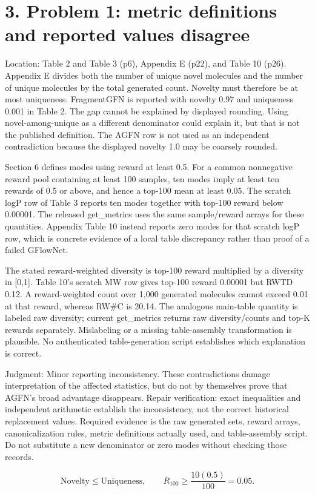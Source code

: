 \documentclass[10pt]{article}
\begin{document}
\section*{3. Problem 1: metric definitions and reported values disagree}
Location: Table 2 and Table 3 (p6), Appendix E (p22), and Table 10 (p26). Appendix E divides both the number of unique novel molecules and the number of unique molecules by the total generated count. Novelty must therefore be at most uniqueness. FragmentGFN is reported with novelty 0.97 and uniqueness 0.001 in Table 2. The gap cannot be explained by displayed rounding. Using novel-among-unique as a different denominator could explain it, but that is not the published definition. The AGFN row is not used as an independent contradiction because the displayed novelty 1.0 may be coarsely rounded.\par
Section 6 defines modes using reward at least 0.5. For a common nonnegative reward pool containing at least 100 samples, ten modes imply at least ten rewards of 0.5 or above, and hence a top-100 mean at least 0.05. The scratch logP row of Table 3 reports ten modes together with top-100 reward below 0.00001. The released get\_metrics uses the same sample/reward arrays for these quantities. Appendix Table 10 instead reports zero modes for that scratch logP row, which is concrete evidence of a local table discrepancy rather than proof of a failed GFlowNet.\par
The stated reward-weighted diversity is top-100 reward multiplied by a diversity in [0,1]. Table 10’s scratch MW row gives top-100 reward 0.00001 but RWTD 0.12. A reward-weighted count over 1,000 generated molecules cannot exceed 0.01 at that reward, whereas RW\#C is 20.14. The analogous main-table quantity is labeled raw diversity; current get\_metrics returns raw diversity/counts and top-K rewards separately. Mislabeling or a missing table-assembly transformation is plausible. No authenticated table-generation script establishes which explanation is correct.\par
Judgment: Minor reporting inconsistency. These contradictions damage interpretation of the affected statistics, but do not by themselves prove that AGFN’s broad advantage disappears. Repair verification: exact inequalities and independent arithmetic establish the inconsistency, not the correct historical replacement values. Required evidence is the raw generated sets, reward arrays, canonicalization rules, metric definitions actually used, and table-assembly script. Do not substitute a new denominator or zero modes without checking those records.\par
\[\mathrm{Novelty}\leq\mathrm{Uniqueness},\qquad \overline R_{100}\geq\frac{10(0.5)}{100}=0.05.\]\par
\end{document}
